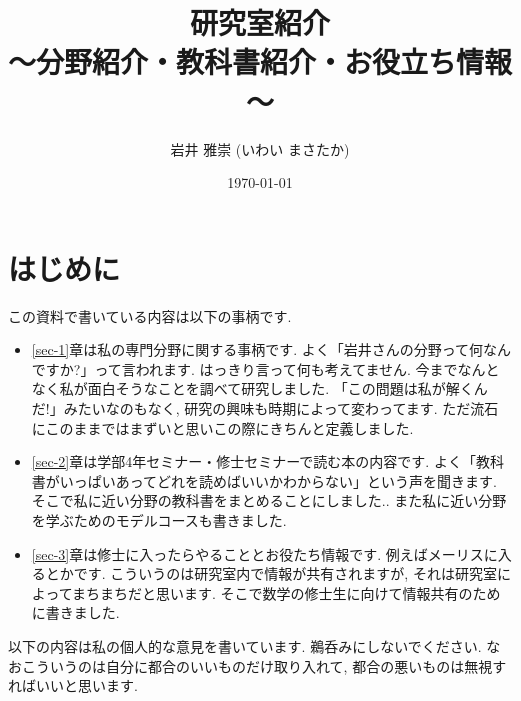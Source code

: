 \documentclass[dvipdfmx,a4paper,12pt]{article} %
\title{研究室紹介\\[0.5em] \large～分野紹介・教科書紹介・お役立ち情報～} %
\author{岩井 雅崇 (いわい まさたか)} %
\date{\today} %
\theoremstyle{definition}
\theoremstyle{remark}
\numberwithin{equation}{section}
\begin{document}

\maketitle %


\section*{はじめに}

この資料で書いている内容は以下の事柄です.
\begin{itemize}[left=0pt]
  \setlength{\parskip}{0cm} %
  \setlength{\itemsep}{8pt} %
  \item \ref{sec-1}章は私の専門分野に関する事柄です. よく「岩井さんの分野って何なんですか?」って言われます. はっきり言って何も考えてません. 今までなんとなく私が面白そうなことを調べて研究しました. 「この問題は私が解くんだ!」みたいなのもなく, 研究の興味も時期によって変わってます. ただ流石にこのままではまずいと思いこの際にきちんと定義しました. 
  \item \ref{sec-2}章は学部4年セミナー・修士セミナーで読む本の内容です. よく「教科書がいっぱいあってどれを読めばいいかわからない」という声を聞きます. そこで私に近い分野の教科書をまとめることにしました..
また私に近い分野を学ぶためのモデルコースも書きました.  
    \item \ref{sec-3}章は修士に入ったらやることとお役たち情報です. 例えばメーリスに入るとかです. 
  こういうのは研究室内で情報が共有されますが, それは研究室によってまちまちだと思います. 
そこで数学の修士生に向けて情報共有のために書きました.   
\end{itemize}

以下の内容は私の個人的な意見を書いています. 鵜呑みにしないでください. なおこういうのは自分に都合のいいものだけ取り入れて, 都合の悪いものは無視すればいいと思います.  

\tableofcontents %





\end{document}
